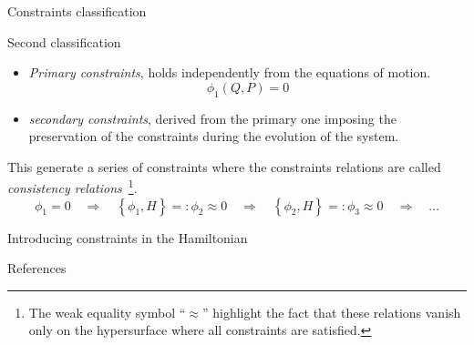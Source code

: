 \documentclass[10pt]{beamer}
\begin{document}
  \begin{frame}{Constraints classification}
    \begin{alertblock}{Second classification}
      \begin{itemize}
        \item \emph{Primary constraints}, holds independently from the equations
          of motion.
        \begin{equation*} \label{eq:constraint}
          \phi_1(Q, P) = 0
        \end{equation*}
        \item \emph{secondary constraints}, derived from the primary one
          imposing the preservation of the constraints during the evolution of
          the system.
      \end{itemize}
      This generate a series of constraints where the constraints relations are
      called \emph{consistency relations}~\footnote{
        The weak equality symbol ``$\approx$'' highlight the fact that these
        relations vanish only on the hypersurface where all constraints are
        satisfied.
      }.
      \begin{equation*} \label{eq:consistency_relations}
        \phi_1 = 0 \quad \Rightarrow \quad
        \left\{ \phi_1 , H \right\} =: \phi_2 \approx 0 \quad \Rightarrow \quad
        \left\{ \phi_2 , H \right\} =: \phi_3 \approx 0 \quad \Rightarrow \quad
        \ldots
      \end{equation*}
    \end{alertblock}
  \end{frame}

  \begin{frame}{Introducing constraints in the Hamiltonian}

  \end{frame}

  \begin{frame}[allowframebreaks]{References}
    
    
  \end{frame}
\end{document}

